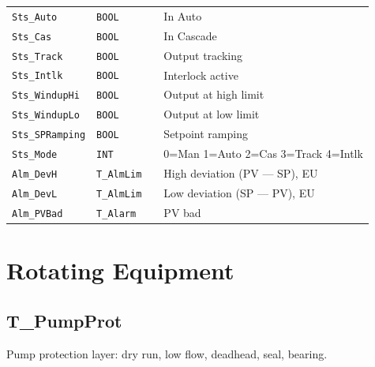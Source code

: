 \begin{small}
\begin{longtable}{@{}P{3.70cm}P{2.20cm}P{1.70cm}P{8.91cm}@{}}
\texttt{Sts\_Auto} & \texttt{BOOL} &  & In Auto \\
\texttt{Sts\_Cas} & \texttt{BOOL} &  & In Cascade \\
\texttt{Sts\_Track} & \texttt{BOOL} &  & Output tracking \\
\texttt{Sts\_Intlk} & \texttt{BOOL} &  & Interlock active \\
\texttt{Sts\_WindupHi} & \texttt{BOOL} &  & Output at high limit \\
\texttt{Sts\_WindupLo} & \texttt{BOOL} &  & Output at low limit \\
\texttt{Sts\_SPRamping} & \texttt{BOOL} &  & Setpoint ramping \\
\texttt{Sts\_Mode} & \texttt{INT} &  & 0=Man 1=Auto 2=Cas 3=Track 4=Intlk \\
\texttt{Alm\_DevH} & \texttt{T\_AlmLim} &  & High deviation (PV --- SP), EU \\
\texttt{Alm\_DevL} & \texttt{T\_AlmLim} &  & Low deviation (SP --- PV), EU \\
\texttt{Alm\_PVBad} & \texttt{T\_Alarm} &  & PV bad \\
\bottomrule
\end{longtable}
\end{small}

\section{Rotating Equipment}

\subsection{T\_PumpProt}\label{sec:pclib-t-pumpprot}

Pump protection layer: dry run, low flow, deadhead, seal, bearing.

\par{}\par

